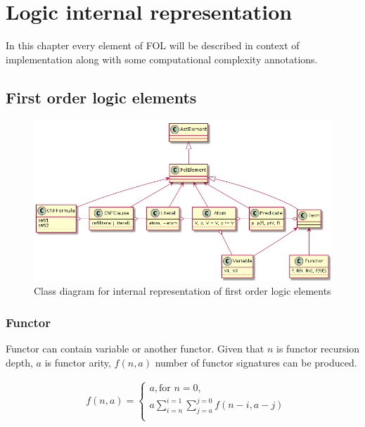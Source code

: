 \chapter{Logic internal representation}
\label{chap:LogicInternalRepresentation}

In this chapter every element of \gls{FOL} will be described in context of implementation along with some computational complexity annotations.

\section{First order logic elements}

\begin{figure}[H]
\begin{centering}
  \includegraphics[width=\textwidth]{logic-formula-generator/fol/cnf_fol_elements.png}
  \caption{Class diagram for internal representation of first order logic elements}
\end{centering}
\end{figure}

\subsection{Functor}

Functor can contain variable or another functor.
Given that
$n$ is functor recursion depth,
$a$ is functor arity,
$f(n, a)$ number of functor signatures can be produced.

\begin{align}
	&f(n, a) =
	\begin{cases}
    a, \text{for } n = 0, \\
		a \sum_{i=n}^{i=1} \sum_{j=a}^{j=0} f(n-i,a-j) \\
	\end{cases}
\end{align}


